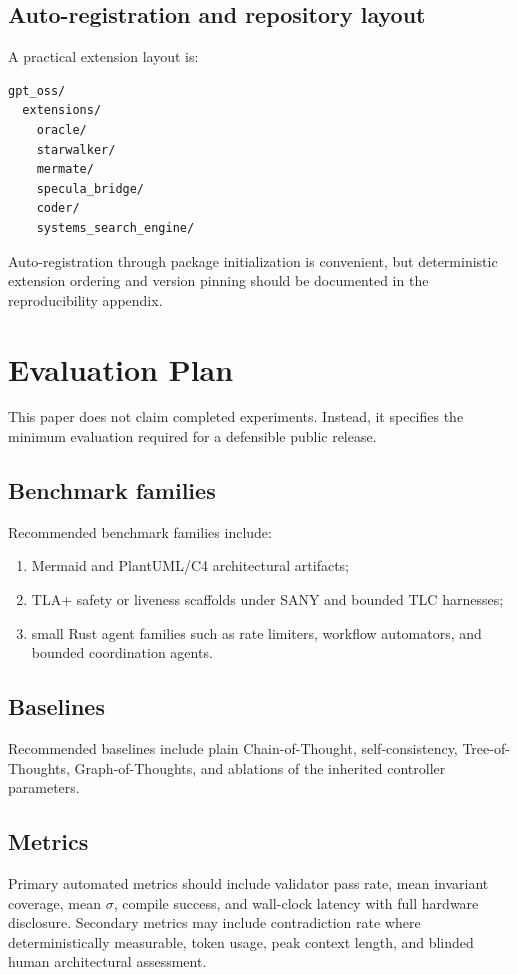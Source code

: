 \documentclass[11pt,a4paper,oneside]{article}
\begin{document}
\subsection{Auto-registration and repository layout}
A practical extension layout is:
\begin{lstlisting}[language=bash,caption={Illustrative extension layout.}]
gpt_oss/
  extensions/
    oracle/
    starwalker/
    mermate/
    specula_bridge/
    coder/
    systems_search_engine/
\end{lstlisting}
Auto-registration through package initialization is convenient, but deterministic extension ordering and version pinning should be documented in the reproducibility appendix.

\section{Evaluation Plan}
This paper does not claim completed experiments. Instead, it specifies the minimum evaluation required for a defensible public release.

\subsection{Benchmark families}
Recommended benchmark families include:
\begin{enumerate}[leftmargin=2em]
    \item Mermaid and PlantUML/C4 architectural artifacts;
    \item TLA+ safety or liveness scaffolds under SANY and bounded TLC harnesses;
    \item small Rust agent families such as rate limiters, workflow automators, and bounded coordination agents.
\end{enumerate}

\subsection{Baselines}
Recommended baselines include plain Chain-of-Thought, self-consistency, Tree-of-Thoughts, Graph-of-Thoughts, and ablations of the inherited controller parameters.

\subsection{Metrics}
Primary automated metrics should include validator pass rate, mean invariant coverage, mean $\sigma$, compile success, and wall-clock latency with full hardware disclosure. Secondary metrics may include contradiction rate where deterministically measurable, token usage, peak context length, and blinded human architectural assessment.
\end{document}
